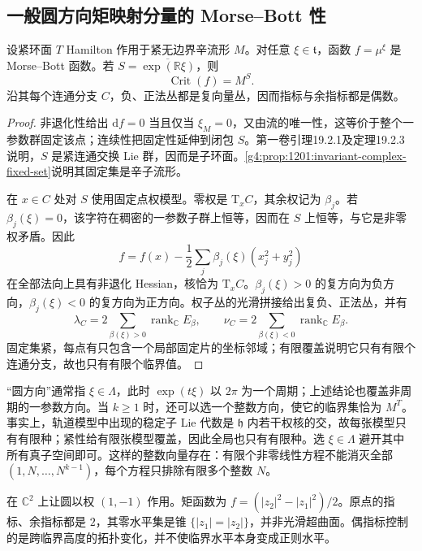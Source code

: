 \subsection{一般圆方向矩映射分量的 Morse–Bott 性}
\label{g4:subsec:1201:05}

\begin{proposition}\label{g4:prop:1201:moment-morse-bott}
	设紧环面 \(T\) Hamilton 作用于紧无边界辛流形 \(M\)。对任意 \(\xi\in\mathfrak t\)，函数 \(f=\mu^\xi\) 是 Morse–Bott 函数。若 \(S=\overline{\exp(\mathbb R\xi)}\)，则
	\[
		\operatorname{Crit}(f)=M^S.
	\]
	沿其每个连通分支 \(C\)，负、正法丛都是复向量丛，因而指标与余指标都是偶数。
\end{proposition}
\begin{proof}
	非退化性给出 \(\mathrm df=0\) 当且仅当 \(\xi_M=0\)，又由流的唯一性，这等价于整个一参数群固定该点；连续性把固定性延伸到闭包 \(S\)。第一卷引理19.2.1及定理19.2.3说明，\(S\) 是紧连通交换 Lie 群，因而是子环面。\cref{g4:prop:1201:invariant-complex-fixed-set}说明其固定集是辛子流形。

	在 \(x\in C\) 处对 \(S\) 使用固定点权模型。零权是 \(\mathrm T_xC\)，其余权记为 \(\beta_j\)。若 \(\beta_j(\xi)=0\)，该字符在稠密的一参数子群上恒等，因而在 \(S\) 上恒等，与它是非零权矛盾。因此
	\[
		f=f(x)-\frac12\sum_j\beta_j(\xi)(x_j^2+y_j^2)
	\]
	在全部法向上具有非退化 Hessian，核恰为 \(\mathrm T_xC\)。\(\beta_j(\xi)>0\) 的复方向为负方向，\(\beta_j(\xi)<0\) 的复方向为正方向。权子丛的光滑拼接给出复负、正法丛，并有
	\begin{equation}\label{g4:eq:1201:even-indices}
		\lambda_C=2\sum_{\beta(\xi)>0}\operatorname{rank}_{\mathbb C}E_\beta,
		\qquad
		\nu_C=2\sum_{\beta(\xi)<0}\operatorname{rank}_{\mathbb C}E_\beta.
	\end{equation}
	固定集紧，每点有只包含一个局部固定片的坐标邻域；有限覆盖说明它只有有限个连通分支，故也只有有限个临界值。
\end{proof}

“圆方向”通常指 \(\xi\in\Lambda\)，此时 \(\exp(t\xi)\) 以 \(2\pi\) 为一个周期；上述结论也覆盖非周期的一参数方向。当 \(k\geq1\) 时，还可以选一个整数方向，使它的临界集恰为 \(M^T\)。事实上，轨道模型中出现的稳定子 Lie 代数是 \(\mathfrak h\) 内若干权核的交，故每张模型只有有限种；紧性给有限张模型覆盖，因此全局也只有有限种。选 \(\xi\in\Lambda\) 避开其中所有真子空间即可。这样的整数向量存在：有限个非零线性方程不能消灭全部 \((1,N,\ldots,N^{k-1})\)，每个方程只排除有限多个整数 \(N\)。

\begin{example}\label{g4:exm:1201:opposite-weights}
	在 \(\mathbb C^2\) 上让圆以权 \((1,-1)\) 作用。矩函数为 \(f=(|z_2|^2-|z_1|^2)/2\)。原点的指标、余指标都是 \(2\)，其零水平集是锥 \(\{|z_1|=|z_2|\}\)，并非光滑超曲面。偶指标控制的是跨临界高度的拓扑变化，并不使临界水平本身变成正则水平。
\end{example}


